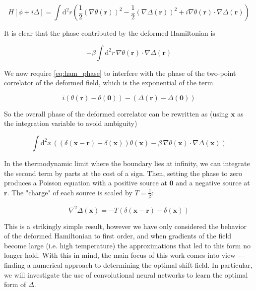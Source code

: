 \documentclass[12pt]{article}
\begin{document}
\begin{equation}
	H[\phi + i\Delta] = \int \mathrm{d}^2r \left(\frac{1}{2}(\nabla \theta(\mathbf{r}))^2 - \frac{1}{2}(\nabla \Delta(\mathbf{r}))^2 + i \nabla\theta(\mathbf{r}) \cdot \nabla\Delta(\mathbf{r}) \right)
\end{equation}

It is clear that the phase contributed by the deformed Hamiltonian is 

\begin{equation} \label{eq:ham_phase}
	{-\beta\int\mathrm{d}^2r \, \nabla\theta(\mathbf{r})\cdot\nabla\Delta(\mathbf{r})}
\end{equation}

We now require \ref{eq:ham_phase} to interfere with the phase of the two-point correlator of the deformed field, which is 
the exponential of the term

\begin{equation}
	i(\theta(\mathbf{r}) - \theta(\mathbf{0})) -(\Delta(\mathbf{r}) - \Delta(\mathbf{0}))
\end{equation}

So the overall phase of the deformed correlator can be rewritten as (using $\mathbf{x}$ as the integration variable to avoid ambiguity)

\begin{equation}
	\int \mathrm{d}^2x \, \left((\delta(\mathbf{x} - \mathbf{r}) - \delta(\mathbf{x}))\theta(\mathbf{x})-\beta \, \nabla\theta(\mathbf{x})\cdot\nabla\Delta(\mathbf{x})\right)
\end{equation}

In the thermodynamic limit where the boundary lies at infinity, we can integrate the second term by parts at the cost of a sign. Then, setting
the phase to zero produces a Poisson equation with a positive source at $\mathbf{0}$ and a negative source at $\mathbf{r}$. The "charge" of each 
source is scaled by $T=\frac{1}{\beta}$:

\begin{equation} \label{eq:Poisson}
	\nabla^2 \Delta(\mathbf{x}) = -T \left( \delta(\mathbf{x} - \mathbf{r}) - \delta(\mathbf{x}) \right)
\end{equation}

This is a strikingly simple result, however we have only considered the behavior of the deformed Hamiltonian to first order, and when gradients
of the field become large (i.e. high temperature) the approximations that led to this form no longer hold. With this in mind, the main focus of 
this work comes into view --- finding a numerical approach to determining the optimal shift field. In particular, we will investigate the use of 
convolutional neural networks to learn the optimal form of $\Delta$.
\end{document}
